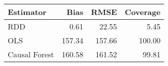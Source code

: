 \begin{table}[ht]
\centering
\begin{tabular}{lrrr}
  \hline
Estimator & Bias & RMSE & Coverage \\ 
  \hline
RDD & 0.61 & 22.55 & 5.45 \\ 
  OLS & 157.34 & 157.66 & 100.00 \\ 
  Causal Forest & 160.58 & 161.52 & 99.81 \\ 
   \hline
\end{tabular}
\end{table}
